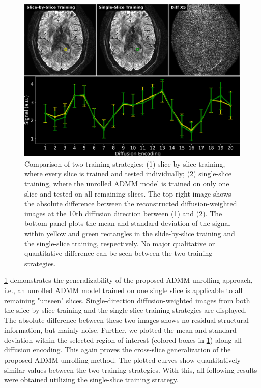 \documentclass[AMA,STIX2COL,Linenumberson]{MRM}
\begin{document}
\begin{figure}
	\includegraphics[width=\textwidth]{./figures/fig3.png}
	\caption{Comparison of two training strategies:
		(1) slice-by-slice training,
		where every slice is trained and tested individually;
		(2) single-slice training,
		where the unrolled ADMM model is trained on only one slice
		and tested on all remaining slices.
		The top-right image shows the absolute difference
		between the reconstructed diffusion-weighted images
		at the 10th diffusion direction
		between (1) and (2).
		The bottom panel plots the mean and standard deviation
		of the signal within yellow and green rectangles
		in the slide-by-slice training and the single-slice training,
		respectively.
		No major qualitative or quantitative difference can be seen
		between the two training strategies.}
	\label{FIG:GENERALIZATION}
\end{figure}

\cref{FIG:GENERALIZATION} demonstrates the generalizability
of the proposed ADMM unrolling approach,
i.e., an unrolled ADMM model trained on one single slice
is applicable to all remaining "unseen" slices.
Single-direction diffusion-weighted images from
both the slice-by-slice training
and the single-slice training strategies are displayed.
The absolute difference between these two images
shows no residual structural information, but mainly noise.
Further, we plotted the mean and standard deviation
within the selected region-of-interest (colored boxes in \cref{FIG:GENERALIZATION})
along all diffusion encoding.
This again proves the cross-slice generalization
of the proposed ADMM unrolling method.
The plotted curves show quantitatively similar values
between the two training strategies.
With this, all following results were obtained
utilizing the single-slice training strategy.
\end{document}
